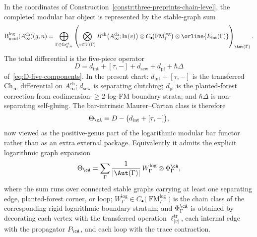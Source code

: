 \begin{construction}
\label{constr:log-modular-bar-functor}
In the coordinates of Construction~\ref{constr:three-preprints-chain-level},
the completed modular bar object is represented by the stable-graph sum
\begin{equation}
\label{eq:log-modular-bar-functor}
\mathrm{B}^{\log}_{\mathrm{mod}}(A^{\mathrm{ch}}_\infty)(g,n)
=
\bigoplus_{\Gamma\in \mathsf{Gr}^{\mathrm{st}}_{g,n}}
\left(
\bigotimes_{v\in V(\Gamma)}
\bar B^{\mathrm{ch}}\bigl(A^{\mathrm{ch}}_\infty;\mathrm{In}(v)\bigr)
\otimes
C_\bullet\!\bigl(\operatorname{FM}^{\log}_{\Gamma}\bigr)
\otimes
\orline{E_{\mathrm{int}}(\Gamma)}
\right)_{\Aut(\Gamma)}.
\end{equation}
The total differential is the five-piece operator
\[
D
=
d_{\mathrm{int}}+[\tau,-]+d_{\mathrm{sew}}+d_{\mathrm{pf}}+\hbar\Delta
\]
of~\eqref{eq:D-five-components}.  In the present chart:
$d_{\mathrm{int}}+[\tau,-]$ is the transferred
$\mathrm{Ch}_\infty$ differential on $A^{\mathrm{ch}}_\infty$;
$d_{\mathrm{sew}}$ is separating clutching;
$d_{\mathrm{pf}}$ is the planted-forest correction from codimension-$\geq2$
log-FM boundary strata; and $\hbar\Delta$ is non-separating self-gluing.
The bar-intrinsic Maurer--Cartan class is therefore
\[
\Theta_\cA
=
D-\bigl(d_{\mathrm{int}}+[\tau,-]\bigr),
\]
now viewed as the positive-genus part of the logarithmic modular bar
functor rather than as an extra external package.  Equivalently it admits the
explicit logarithmic graph expansion
\begin{equation}
\label{eq:theta-logarithmic-graph-expansion}
\Theta_\cA
=
\sum_{\Gamma}
\frac{1}{|\Aut(\Gamma)|}\,
W^{\log}_{\Gamma}\otimes \Phi^{\cA}_{\Gamma},
\end{equation}
where the sum runs over connected stable graphs carrying at least one
separating edge, planted-forest corner, or loop;
$W^{\log}_{\Gamma}\in C_\bullet\!\bigl(\operatorname{FM}^{\log}_{\Gamma}\bigr)$ is
the chain class of the corresponding rigid logarithmic boundary stratum; and
$\Phi^{\cA}_{\Gamma}$ is obtained by decorating each vertex with the
transferred operation $\ell^{\mathrm{tr}}_{|v|}$, each internal edge with the
propagator $P_\cA$, and each loop with the trace contraction.
\end{construction}

